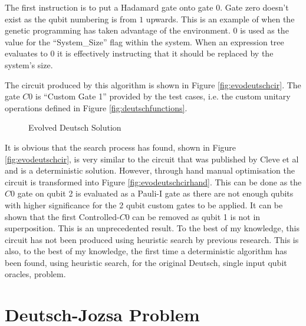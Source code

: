 The first instruction is to put a Hadamard gate onto gate $0$.
Gate zero doesn't exist as the qubit numbering is from $1$ upwards.
This is an example of when the genetic programming has taken advantage of the environment.
$0$ is used as the value for the ``System\_Size'' flag within the system.
When an expression tree evaluates to $0$ it is effectively instructing that it should be replaced by the system's size.

The circuit produced by this algorithm is shown in Figure \ref{fig:evodeutschcir}.
The gate $C0$ is ``Custom Gate 1'' provided by the test cases, i.e. the custom unitary operations defined in Figure \ref{fig:deutschfunctions}.

\begin{figure}
\centering
{}
\caption{Evolved Deutsch Solution}
\end{figure}

It is obvious that the search process has found, shown in Figure \ref{fig:evodeutschcir}, is very similar to the circuit that was published by Cleve et al\cite{Cleve98quantumalgorithms} and is a deterministic solution.
However, through hand manual optimisation the circuit is transformed into Figure \ref{fig:evodeutschcirhand}.
This can be done as the $C0$ gate on qubit 2 is evaluated as a Pauli-I gate as there are not enough qubits with higher significance for the 2 qubit custom gates to be applied.
It can be shown that the first Controlled-$C0$ can be removed as qubit 1 is not in superposition.
This is an unprecedented result.
To the best of my knowledge, this circuit has not been produced using heuristic search by previous research.
This is also, to the best of my knowledge, the first time a deterministic algorithm has been found, using heuristic search, for the original Deutsch, single input qubit oracles, problem.

\section{Deutsch-Jozsa Problem}
\label{sec:deutschjozsaexperiment}

